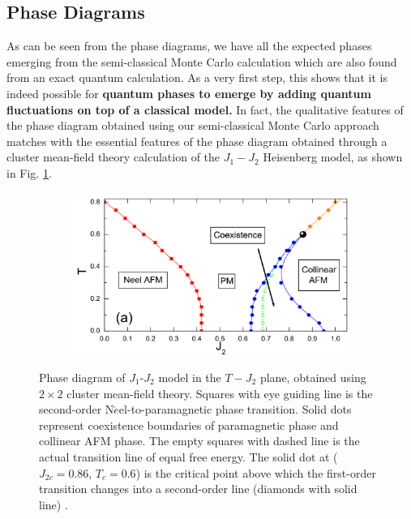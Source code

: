 \documentclass[../thesis_main.tex]{subfiles}
\begin{document}
\subsection{Phase Diagrams}
As can be seen from the phase diagrams, we have all the expected phases emerging from the semi-classical Monte Carlo calculation which are also found from an exact quantum calculation. As a very first step, this shows that it is indeed possible for \textbf{quantum phases to emerge by adding quantum fluctuations on top of a classical model.} In fact, the qualitative features of the phase diagram obtained using our semi-classical Monte Carlo approach matches with the essential features of the phase diagram obtained through a cluster mean-field theory calculation of the $J_1-J_2$ Heisenberg model, as shown in Fig. \ref{CMFT}. 

\begin{figure}[!htb]
    \centering
    \begin{subfigure}[b]{0.6\textwidth}  %
        \centering
        \includegraphics[width=\textwidth]{images/j1-j2/CMFT_diagram.png}
    \end{subfigure}
    \caption{Phase diagram of $J_{1}$-$J_{2}$ model in the $T-J_{2}$ plane, obtained
    using $2 \times 2$ cluster mean-field theory. Squares with eye
    guiding line is the second-order N$\acute{e}$el-to-paramagnetic phase transition.
    Solid dots represent coexistence boundaries of paramagnetic phase and
    collinear AFM phase. The empty squares with dashed line is the actual transition line
    of equal free energy. The solid dot at ($J_{2c}=0.86$, $T_{c}=0.6$) is the critical point above which the
  first-order transition changes into a second-order line (diamonds
  with solid line) \cite{Ren_2014}.}
    \label{CMFT}
\end{figure}
\end{document}

